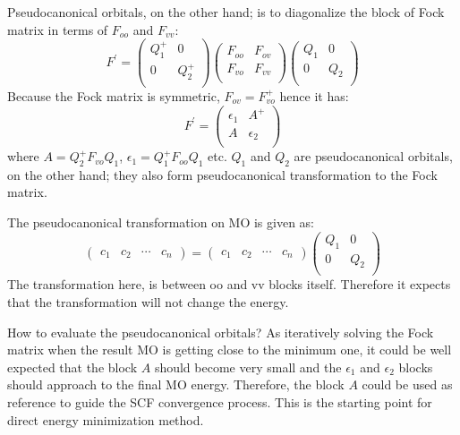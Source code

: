 Pseudocanonical orbitals, on the other hand; is to diagonalize the block of Fock matrix
in terms of $F_{oo}$ and $F_{vv}$:
\begin{equation}\label{DM_SCF_eq:3}
 F^{'} = 
\begin{pmatrix}
 Q_{1}^{+}  &  0  \\
 0          &  Q_{2}^{+}\\
\end{pmatrix}
\begin{pmatrix}
 F_{oo}  &  F_{ov}  \\
 F_{vo}  &  F_{vv}  \\
\end{pmatrix}
\begin{pmatrix}
 Q_{1}    &  0  \\
 0        &  Q_{2}\\
\end{pmatrix}
\end{equation}
Because the Fock matrix is symmetric, $F_{ov} = F_{vo}^{+}$ hence it has:
\begin{equation}\label{DM_SCF_eq:4}
 F^{'} = 
 \begin{pmatrix}
 \epsilon_{1}    &  A^{+}    \\
 A               &  \epsilon_{2}\\
\end{pmatrix}
\end{equation}
where $A = Q_{2}^{+}F_{vo}Q_{1}$, $\epsilon_{1} = Q_{1}^{+}F_{oo}Q_{1}$ etc.
$Q_{1}$ and $Q_{2}$ are pseudocanonical orbitals, on the other hand; they
also form pseudocanonical transformation to the Fock matrix.

The pseudocanonical transformation on MO is given as:
\begin{equation}\label{DM_SCF_eq:100}
 \begin{pmatrix}
  c_{1} & c_{2} & \cdots  & c_{n}
 \end{pmatrix}
= 
 \begin{pmatrix}
  c_{1} & c_{2} & \cdots  & c_{n}
 \end{pmatrix}
\begin{pmatrix}
 Q_{1}    &  0  \\
 0        &  Q_{2}\\
\end{pmatrix}
\end{equation}
The transformation here, is between oo and vv blocks itself. Therefore it expects
that the transformation will not change the energy.

How to evaluate the pseudocanonical orbitals? As iteratively solving the Fock
matrix when the result MO is getting close to the minimum one, it could be 
well expected that the block $A$ should become very small and the $\epsilon_{1}$
and $\epsilon_{2}$ blocks should approach to the final MO energy. Therefore,
the block $A$ could be used as reference to guide the SCF convergence process.
This is the starting point for direct energy minimization method.

